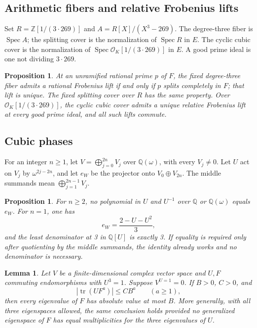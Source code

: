 \documentclass[11pt]{article}
\newtheorem{proposition}[theorem]{Proposition}
\newtheorem{lemma}[theorem]{Lemma}
\theoremstyle{remark}\newtheorem{remark}[theorem]{Remark}
\newcommand{\Q}{\mathbb Q}\newcommand{\Z}{\mathbb Z}\newcommand{\C}{\mathbb C}
\newcommand{\Spec}{\operatorname{Spec}}\newcommand{\tr}{\operatorname{tr}}
\begin{document}
\subsection*{Arithmetic fibers and relative Frobenius lifts}
Set $R=\Z[1/(3\cdot269)]$ and $A=R[X]/(X^3-269)$.
The degree-three fiber is $\Spec A$; the splitting cover is the
normalization of $\Spec R$ in $E$. The cyclic cubic cover is the
normalization of $\Spec\mathcal O_K[1/(3\cdot269)]$ in $E$.
A good prime ideal is one not dividing $3\cdot269$.
\begin{proposition}\label{th:frobenius}
At an unramified rational prime $p$ of $F$, the fixed degree-three fiber admits a rational Frobenius lift if and only if $p$ splits completely in $F$; that lift is unique. The fixed splitting cover over $R$ has the same property. Over $\mathcal O_K[1/(3\cdot269)]$, the cyclic cubic cover admits a unique relative Frobenius lift at every good prime ideal, and all such lifts commute.
\end{proposition}

\subsection*{Cubic phases}
For an integer $n\ge1$, let $V=\bigoplus_{j=0}^{2n}V_j$ over
$\Q(\omega)$, with every $V_j\ne0$. Let $U$ act on $V_j$ by
$\omega^{2j-2n}$, and let $e_W$ be the projector onto
$V_0\oplus V_{2n}$. The middle summands mean
$\bigoplus_{j=1}^{2n-1}V_j$.
\begin{proposition}\label{th:phase}
For $n\ge2$, no polynomial in $U$ and $U^{-1}$ over $\Q$ or $\Q(\omega)$ equals $e_W$. For $n=1$, one has
\[
 e_W=\frac{2-U-U^2}{3},
\]
and the least denominator at 3 in $\Q[U]$ is exactly 3. If equality is required only after quotienting by the middle summands, the identity already works and no denominator is necessary.
\end{proposition}

\begin{lemma}\label{lem:commuting-phase}
Let $V$ be a finite-dimensional complex vector space and $U,F$ commuting endomorphisms with $U^3=1$. Suppose $V^{U=1}=0$. If $B>0$, $C>0$, and
\[
 |\tr(UF^a)|\le C B^a\qquad(a\ge1),
\]
then every eigenvalue of $F$ has absolute value at most $B$. More generally, with all three eigenspaces allowed, the same conclusion holds provided no generalized eigenspace of $F$ has equal multiplicities for the three eigenvalues of $U$.
\end{lemma}
\end{document}
